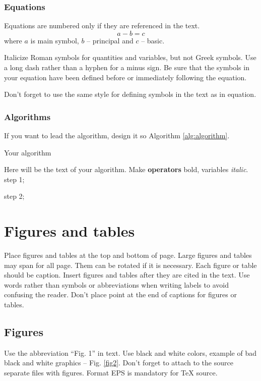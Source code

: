 \documentclass[conference]{IEEEtran}
\begin{document}
\subsubsection{Equations}
Equations are numbered only if they are referenced in the text. 
\begin{equation}
	a-b=c
	\label{eq:1}
\end{equation}
where $a$ is main symbol, $b$ -- principal and $c$ -- basic.

Italicize Roman symbols for quantities and variables, but not Greek symbols. Use a long dash rather than a hyphen for a minus sign. Be sure that the symbols in your equation have been defined before or immediately following the equation.

Don't forget to use the same style for defining symbols in the text as in equation.

\subsubsection{Algorithms}
If you want to lead the algorithm, design it so Algorithm \ref{alg:algorithm}.

\begin{algorithm}
  \caption{Your algorithm}\label{alg:algorithm}
  \begin{algorithmic}
 
 \item Here will be the text of your algorithm. Make \textbf{operators} bold, variables \textit{italic}. step 1;
 \item step 2;
  \end{algorithmic}
\end{algorithm}

\section{Figures and tables}
Place figures and tables at the top and bottom of  page. Large figures and tables may span for all page. Them can be rotated if it is necessary. Each figure or table should be caption. Insert figures and tables after they are cited in the text. Use words rather than symbols or abbreviations when writing labels to avoid confusing the reader. Don't place point at the end of captions for figures or tables. 

\subsection{Figures}
Use the abbreviation ``Fig. 1'' in text. Use black and white colors, example of bad black and white graphics -- Fig. \ref{fig2}. Don't forget to attach to the source separate files with figures. Format EPS is mandatory for TeX source.
\end{document}
